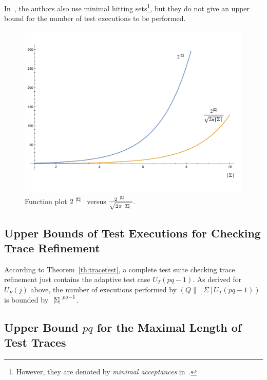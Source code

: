 In~\cite{DBLP:conf/icfem/CavalcantiG07}, the authors also use minimal hitting
sets\footnote{However, they are denoted by {\it minimal acceptances}
in~\cite{DBLP:conf/icfem/CavalcantiG07}.}, but they do not give an upper
bound for the number of test executions to be performed.

 \begin{figure}
 \begin{center}
\includegraphics[width=.8\textwidth]{minhit-fig.pdf}
\end{center}
\vspace*{-10mm}
\caption{Function plot $2^{{~|\! \Sigma\!|~}}$ versus $\frac{2^{~|\! \Sigma\!|~}}{\sqrt{2\pi {~|\! \Sigma\!|~}}}$.}
 \label{fig:minhita}
 \end{figure}

\subsection{Upper Bounds of Test Executions for Checking Trace Refinement}

According to Theorem~\ref{th:tracetest}, a complete test suite checking trace
refinement just contains the adaptive test case $U_T(pq-1)$. As derived for
$U_F(j)$ above, the number of executions performed by $(Q\parallel[\Sigma]
U_T(pq-1))$ is bounded by ${~|\! \Sigma\!|~}^{pq-1}$.

\subsection{Upper Bound $pq$ for the Maximal Length of Test Traces}

